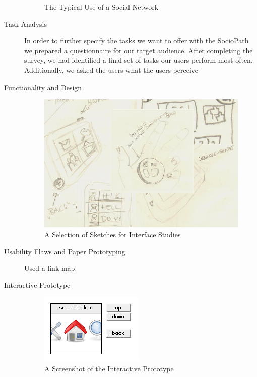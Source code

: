 \begin{description}
\begin{figure}[h]
\begin{center}
  \end{center}
  \caption{The Typical Use of a Social Network}
  \label{fig:context}
\end{figure}
  \item[Task Analysis]
    In order to further specify the tasks we want to offer with the SocioPath
    we prepared a questionnaire for our target audience. After completing the 
    survey, we had identified a final set of tasks our users perform most often. 
    Additionally, we asked the users what the users perceive
  \item[Functionality and Design]
\begin{figure}[h]
  \begin{center}
    \includegraphics[width=0.8\linewidth]{imgs/sketches.png}
  \end{center}
  \caption{A Selection of Sketches for Interface Studies}
  \label{fig:sketches}
\end{figure}
  \item[Usability Flaws and Paper Prototyping]
    Used a link map.
  \item[Interactive Prototype]
\begin{figure}[h]
  \begin{center}
    \includegraphics[width=0.8\linewidth]{imgs/screen.png}
  \end{center}
  \caption{A Screenshot of the Interactive Prototype}
  \label{fig:prototype}
\end{figure}
\end{description}
